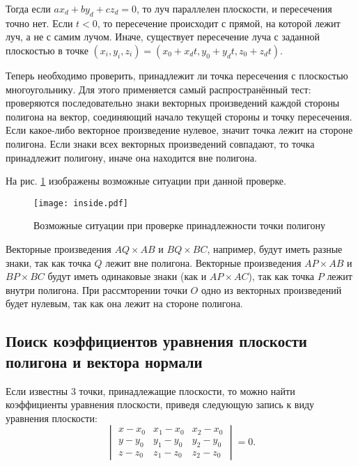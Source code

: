 Тогда если $ax_d + by_d + cz_d = 0$, то луч параллелен плоскости, и пересечения точно нет. Если $t < 0$, то пересечение происходит с прямой, на которой лежит луч, а не с самим лучом. Иначе, существует пересечение луча с заданной плоскостью в точке $(x_i, y_i, z_i) = (x_0 + x_dt, y_0 + y_dt, z_0 + z_dt)$. 

Теперь необходимо проверить, принадлежит ли точка пересечения с плоскостью многоугольнику. Для этого применяется самый распространённый тест: проверяются последовательно знаки векторных произведений каждой стороны полигона на вектор, соединяющий начало текущей стороны и точку пересечения. Если какое-либо векторное произведение нулевое, значит точка лежит на стороне полигона. Если знаки всех векторных произведений совпадают, то точка принадлежит полигону, иначе она находится вне полигона.

На рис. \ref{img:inside} изображены возможные ситуации при данной проверке.

\newpage

\begin{figure}[h!]
    \centering
    \texttt{[image: inside.pdf]}
    \caption{Возможные ситуации при проверке принадлежности точки полигону}
    \label{img:inside}
\end{figure}

Векторные произведения $AQ \times AB$ и $BQ \times BC$, например, будут иметь разные знаки, так как точка $Q$ лежит вне полигона. Векторные произведения $AP \times AB$ и $BP \times BC$ будут иметь одинаковые знаки (как и $AP \times AC$), так как точка $P$ лежит внутри полигона. При рассмторении точки $O$ одно из векторных произведений будет нулевым, так как она лежит на стороне полигона.

\subsection{Поиск коэффициентов уравнения плоскости полигона и вектора нормали}
Если известны 3 точки, принадлежащие плоскости, то можно найти коэффициенты уравнения плоскости, приведя следующую запись к виду уравнения плоскости:
\begin{equation}
	\begin{vmatrix}
		x - x_0 & x_1 - x_0 & x_2 - x_0 \\
		y - y_0 & y_1 - y_0 & y_2 - y_0 \\
		z - z_0 & z_1 - z_0 & z_2 - z_0
	\end{vmatrix} = 0.
\end{equation}

